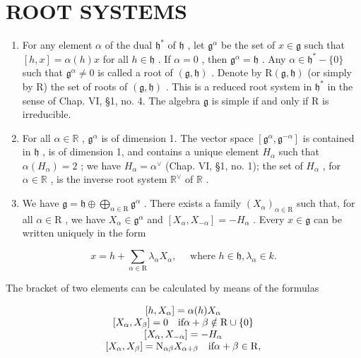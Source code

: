 \section*{ROOT SYSTEMS}

\begin{enumerate}
\def\labelenumi{\arabic{enumi})}
\setcounter{enumi}{4}
\item
  For any element \(\alpha\) of the dual \(\mathfrak{h}^*\) of \(\mathfrak{h}\) , let \(\mathfrak{g}^{\alpha}\) be the set of \(x\in \mathfrak{g}\) such that \([h,x] = \alpha (h)x\) for all \(h\in \mathfrak{h}\) . If \(\alpha = 0\) , then \(\mathfrak{g}^{\alpha} = \mathfrak{h}\) . Any \(\alpha \in \mathfrak{h}^{*} - \{0\}\) such that \(\mathfrak{g}^{\alpha}\neq 0\) is called a root of \((\mathfrak{g},\mathfrak{h})\) . Denote by \(\mathrm{R}(\mathfrak{g},\mathfrak{h})\) (or simply by R) the set of roots of \((\mathfrak{g},\mathfrak{h})\) . This is a reduced root system in \(\mathfrak{h}^*\) in the sense of Chap. VI, §1, no. 4. The algebra \(\mathfrak{g}\) is simple if and only if R is irreducible.
\item
  For all \(\alpha \in \mathbb{R}\) , \(\mathfrak{g}^{\alpha}\) is of dimension 1. The vector space \([\mathfrak{g}^{\alpha}, \mathfrak{g}^{-\alpha}]\) is contained in \(\mathfrak{h}\) , is of dimension 1, and contains a unique element \(H_{\alpha}\) such that \(\alpha(H_{\alpha}) = 2\) ; we have \(H_{\alpha} = \alpha^{\vee}\) (Chap. VI, §1, no. 1); the set of \(H_{\alpha}\) , for \(\alpha \in \mathbb{R}\) , is the inverse root system \(\mathbb{R}^{\vee}\) of \(\mathbb{R}\) .
\item
  We have \(\mathfrak{g} = \mathfrak{h} \oplus \bigoplus_{\alpha \in \mathrm{R}} \mathfrak{g}^{\alpha}\) . There exists a family \((X_{\alpha})_{\alpha \in \mathrm{R}}\) such that, for all \(\alpha \in \mathrm{R}\) , we have \(X_{\alpha} \in \mathfrak{g}^{\alpha}\) and \([X_{\alpha}, X_{-\alpha}] = -H_{\alpha}\) . Every \(x \in \mathfrak{g}\) can be written uniquely in the form
\end{enumerate}

\[
x = h + \sum_ {\alpha \in \mathrm{R}} \lambda_ {\alpha} X _ {\alpha}, \quad \text { where } h \in \mathfrak {h}, \lambda_ {\alpha} \in k.
\]

The bracket of two elements can be calculated by means of the formulas

\[
\begin{array}{c} [ h, X _ {\alpha} ] = \alpha (h) X _ {\alpha} \\ \relax [ X _ {\alpha}, X _ {\beta} ] = 0 \quad \text {if} \alpha + \beta \notin \mathrm{R} \cup \{0 \} \\ \relax [ X _ {\alpha}, X _ {- \alpha} ] = - H _ {\alpha} \\ \relax [ X _ {\alpha}, X _ {\beta} ] = \mathrm{N} _ {\alpha \beta} X _ {\alpha + \beta} \quad \text {if} \alpha + \beta \in \mathrm{R}, \end{array}
\]

